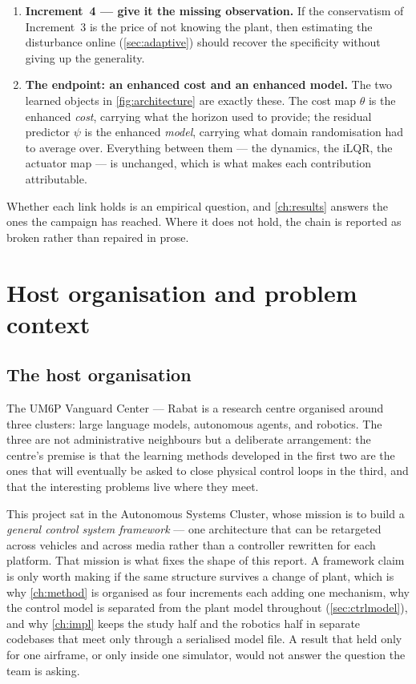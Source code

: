 \documentclass[11pt,a4paper,twoside,openright]{report}
\newcommand{\HostOrg}{The UM6P Vanguard Center --- Rabat}
\newcommand{\HostTeam}{Autonomous Systems Cluster}
\theoremstyle{plain}
\theoremstyle{definition}
\theoremstyle{remark}
\begin{document}
\begin{enumerate}[leftmargin=*]
		\item \textbf{Increment~4 --- give it the missing observation.} If the
		conservatism of Increment~3 is the price of not knowing the plant, then
		estimating the disturbance online (\cref{sec:adaptive}) should recover the
		specificity without giving up the generality.

		\item \textbf{The endpoint: an enhanced cost and an enhanced model.} The two
		learned objects in \cref{fig:architecture} are exactly these. The cost map
		$\theta$ is the enhanced \emph{cost}, carrying what the horizon used to
		provide; the residual predictor $\psi$ is the enhanced \emph{model}, carrying
		what domain randomisation had to average over. Everything between them ---
		the dynamics, the iLQR, the actuator map --- is unchanged, which is what makes
		each contribution attributable.
	\end{enumerate}

	Whether each link holds is an empirical question, and \cref{ch:results} answers
	the ones the campaign has reached. Where it does not hold, the chain is reported
	as broken rather than repaired in prose.

	\chapter{Host organisation and problem context}
	\label{ch:context}

	\section{The host organisation}

	\HostOrg{} is a research centre organised around three clusters: large
	language models, autonomous agents, and robotics. The three are not
	administrative neighbours but a deliberate arrangement: the centre's premise
	is that the learning methods developed in the first two are the ones that
	will eventually be asked to close physical control loops in the third, and
	that the interesting problems live where they meet.

	This project sat in the \HostTeam, whose mission is to build a
	\emph{general control system framework} --- one architecture that can be
	retargeted across vehicles and across media rather than a controller
	rewritten for each platform. That mission is what fixes the shape of this
	report. A framework claim is only worth making if the same structure
	survives a change of plant, which is why \cref{ch:method} is organised as
	four increments each adding one mechanism, why the control model is
	separated from the plant model throughout (\cref{sec:ctrlmodel}), and
	why \cref{ch:impl} keeps the study half and the robotics half in separate
	codebases that meet only through a serialised model file. A result that
	held only for one airframe, or only inside one simulator, would not answer
	the question the team is asking.
\end{document}
